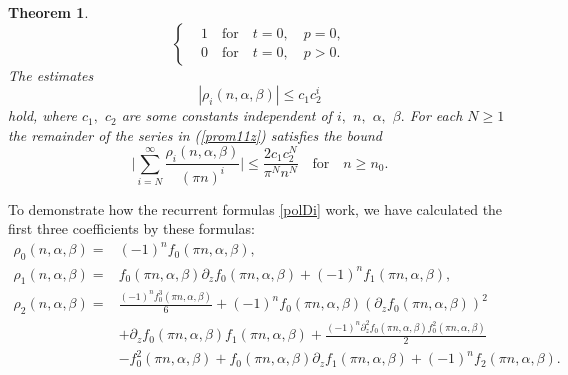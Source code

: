 \documentclass[10pt, a4paper]{article}
\theoremstyle{plain}
\newtheorem{theorem}{Theorem}
\theoremstyle{definition}
\numberwithin{equation}{section}
\def\p{\partial}
\def\a{\alpha}
\def\b{\beta}
\begin{document}
\begin{theorem}
\begin{equation}
\left\{
\begin{aligned}
& 1 \quad\text{for}\quad t=0, \quad p=0,
\\
&0 \quad \text{for}\quad t=0,\quad p>0.
\end{aligned}
\right. \label{2.2}
\end{equation}
The estimates
\begin{equation}\label{4.3}
|\rho_i(n,\a,\b)|\leqslant c_{1}c_{2}^i
\end{equation}
hold, where $c_{1},$ $c_{2}$ are some constants independent of $i,$ $n,$ $\a,$ $\b.$ For each $N\geqslant 1$ the remainder of the series in (\ref{prom11z}) satisfies the bound
\begin{equation}\label{4.19}
\bigg|\sum\limits_{i=N}^{\infty} \frac{\rho_i(n,\alpha, \beta)}{(\pi n)^i}\bigg| \leqslant \frac{2c_{1}c_{2}^N}{\pi^N n^N}\quad\text{for}\quad n\geqslant n_0.
\end{equation}
\end{theorem}



To demonstrate how the recurrent formulas \eqref{polDi} work, we have calculated the first three coefficients by these formulas:
\begin{equation}\label{coeffD}
\begin{aligned}
\rho_0(n,\alpha, \beta)=&(-1)^nf_0(\pi n,\a,\b),
\\
\rho_1(n,\alpha, \beta)=&f_0(\pi n,\a,\b)\p_z f_0(\pi n,\a,\b)
+(-1)^n f_1(\pi n,\a,\b), \\
\rho_2(n,\a,\b)=& \frac{(-1)^nf_0^3(\pi n,\a, \b)}{6}
+(-1)^nf_0(\pi n,\a,\b)
(\p_z f_0(\pi n,\a,\b))^2
\\
&+\p_z f_0(\pi n,\a,\b)f_1(\pi n,\a,\b)
+\frac{(-1)^n \p_z^2 f_0(\pi n,\alpha,\beta)f_0^2(\pi n,\a, \b)}{2}
\\
&-f_0^2(\pi n,\a, \b)+f_0(\pi n,\a,\b)
 \p_z f_1(\pi n,\a,\b)+(-1)^nf_2(\pi n,\a,\b).
\end{aligned}
\end{equation}
\end{document}
